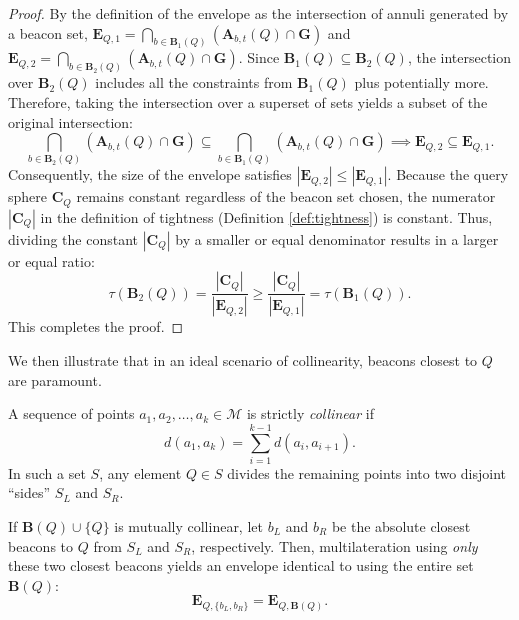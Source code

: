 \documentclass[10pt,runningheads]{llncs}
\begin{document}
\begin{proof}
    By the definition of the envelope as the intersection of annuli generated by a beacon set, $\textbf{E}_{Q, 1} = \bigcap_{b \in \textbf{B}_1(Q)} (\textbf{A}_{b, t}(Q) \cap \textbf{G})$ and $\textbf{E}_{Q, 2} = \bigcap_{b \in \textbf{B}_2(Q)} (\textbf{A}_{b, t}(Q) \cap \textbf{G})$.
    Since $\textbf{B}_1(Q) \subseteq \textbf{B}_2(Q)$, the intersection over $\textbf{B}_2(Q)$ includes all the constraints from $\textbf{B}_1(Q)$ plus potentially more. Therefore, taking the intersection over a superset of sets yields a subset of the original intersection:
    \begin{equation*}
        \bigcap_{b \in \textbf{B}_2(Q)} (\textbf{A}_{b, t}(Q) \cap \textbf{G}) \subseteq \bigcap_{b \in \textbf{B}_1(Q)} (\textbf{A}_{b, t}(Q) \cap \textbf{G}) \implies \textbf{E}_{Q, 2} \subseteq \textbf{E}_{Q, 1}.
    \end{equation*}
    Consequently, the size of the envelope satisfies $|\textbf{E}_{Q, 2}| \leq |\textbf{E}_{Q, 1}|$. 
    Because the query sphere $\textbf{C}_Q$ remains constant regardless of the beacon set chosen, the numerator $|\textbf{C}_Q|$ in the definition of tightness (Definition \ref{def:tightness}) is constant. Thus, dividing the constant $|\textbf{C}_Q|$ by a smaller or equal denominator results in a larger or equal ratio:
    \begin{equation*}
        \tau(\textbf{B}_2(Q)) = \frac{|\textbf{C}_Q|}{|\textbf{E}_{Q, 2}|} \geq \frac{|\textbf{C}_Q|}{|\textbf{E}_{Q, 1}|} = \tau(\textbf{B}_1(Q)).
    \end{equation*}
    This completes the proof.
\end{proof}

We then illustrate that in an ideal scenario of collinearity, beacons closest to $Q$ are paramount.

\begin{definition}
    A sequence of points $a_1, a_2, \dots, a_k \in \mathcal{M}$ is strictly \textit{collinear} if 
    \begin{equation*}
        d(a_1, a_k) = \sum_{i=1}^{k-1} d(a_i, a_{i+1}).
    \end{equation*} 
    In such a set $S$, any element $Q \in S$ divides the remaining points into two disjoint ``sides'' $S_L$ and $S_R$.
\end{definition}

\begin{theorem}
  If $\textbf{B}(Q) \cup \{Q\}$ is mutually collinear, let $b_L$ and $b_R$ be the absolute closest beacons to $Q$ from $S_L$ and $S_R$, respectively. Then, multilateration using \textit{only} these two closest beacons yields an envelope identical to using the entire set $\textbf{B}(Q)$:
  \begin{equation}
      \textbf{E}_{Q, \{b_L, b_R\}} = \textbf{E}_{Q, \textbf{B}(Q)}.
  \end{equation}
  \label{thm:nearestbest}
\end{theorem}
\end{document}
